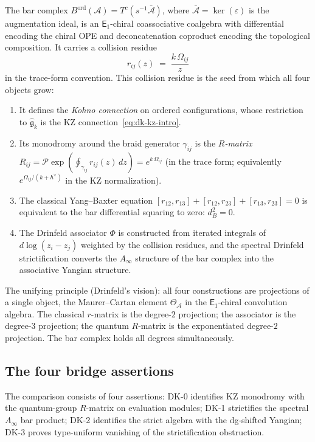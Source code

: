 \documentclass[11pt,reqno]{amsart}
\theoremstyle{definition}
\theoremstyle{remark}
\newcommand{\cA}{\mathcal{A}}
\newcommand{\cP}{\mathcal{P}}
\newcommand{\Ainf}{A_{\infty}}
\newcommand{\Eone}{\mathsf{E}_{1}}
\newcommand{\fg}{\mathfrak{g}}
\newcommand{\kp}{k + h^{\vee}}
\numberwithin{equation}{section}
\begin{document}
The bar complex
$B^{\mathrm{ord}}(\cA) = T^c(s^{-1}\bar{\cA})$,
where $\bar{\cA} = \ker(\varepsilon)$ is the augmentation
ideal, is an $\Eone$-chiral coassociative coalgebra
with differential encoding the chiral OPE and
deconcatenation coproduct encoding the topological
composition.  It carries a collision residue
\begin{equation}\label{eq:dk-collision-intro}
r_{ij}(z)
\;=\;
\frac{k\,\Omega_{ij}}{z}
\end{equation}
in the trace-form convention.
This collision residue is the seed from which all four
objects grow:
\begin{enumerate}[label=(\arabic*)]
\item It defines the \emph{Kohno connection} on ordered
  configurations, whose restriction to $\widehat{\fg}_k$
  is the KZ connection~\eqref{eq:dk-kz-intro}.
\item Its monodromy around the braid generator $\gamma_{ij}$
  is the \emph{$R$-matrix}
  $R_{ij} = \cP\exp(\oint_{\gamma_{ij}} r_{ij}(z)\,dz)
  = e^{k\,\Omega_{ij}}$ (in the trace form; equivalently
  $e^{\Omega_{ij}/(\kp)}$ in the KZ normalization).
\item The classical Yang--Baxter equation
  $[r_{12}, r_{13}] + [r_{12}, r_{23}] + [r_{13}, r_{23}] = 0$
  is equivalent to the bar differential squaring to zero:
  $d_B^2 = 0$.
\item The Drinfeld associator $\Phi$ is constructed from
  iterated integrals of $d\log(z_i - z_j)$ weighted by
  the collision residues, and the spectral Drinfeld
  strictification converts the $\Ainf$ structure of the
  bar complex into the associative Yangian structure.
\end{enumerate}

The unifying principle (Drinfeld's vision): all four
constructions are projections of a single object, the
Maurer--Cartan element $\Theta_\cA$ in the $\Eone$-chiral
convolution algebra.  The classical $r$-matrix is the
degree-$2$ projection; the associator is the degree-$3$
projection; the quantum $R$-matrix is the exponentiated
degree-$2$ projection.  The bar complex holds all degrees
simultaneously.

\subsection{The four bridge assertions}

The comparison consists of four assertions: DK-0 identifies KZ
monodromy with the quantum-group $R$-matrix on evaluation modules;
DK-1 strictifies the spectral $\Ainf$ bar product; DK-2 identifies the
strict algebra with the dg-shifted Yangian; DK-3 proves type-uniform
vanishing of the strictification obstruction.
\end{document}
